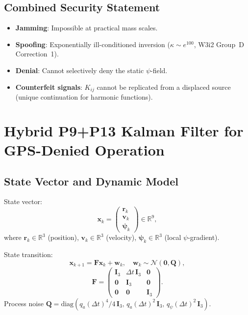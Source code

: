 \documentclass[aps,prd,twocolumn,superscriptaddress,nofootinbib]{revtex4-2}
\newcommand{\Kij}{K_{ij}}
\begin{document}
\subsection{Combined Security Statement}

\begin{itemize}
\item \textbf{Jamming}: Impossible at practical mass scales.
\item \textbf{Spoofing}: Exponentially ill-conditioned inversion
  ($\kappa \sim e^{100}$, W3i2 Group~D Correction~1).
\item \textbf{Denial}: Cannot selectively deny the static $\psi$-field.
\item \textbf{Counterfeit signals}: $\Kij$ cannot be replicated from
  a displaced source (unique continuation for harmonic functions).
\end{itemize}

\section{Hybrid P9+P13 Kalman Filter for GPS-Denied Operation}
\label{sec:kalman}

\subsection{State Vector and Dynamic Model}

State vector:
\begin{equation}
\mathbf{x}_k = \begin{pmatrix} \mathbf{r}_k \\ \mathbf{v}_k \\ \boldsymbol{\psi}_k \end{pmatrix}
\in \mathbb{R}^9,
\label{eq:state}
\end{equation}
where $\mathbf{r}_k \in \mathbb{R}^3$ (position), $\mathbf{v}_k \in \mathbb{R}^3$
(velocity), $\boldsymbol{\psi}_k \in \mathbb{R}^3$ (local $\psi$-gradient).

State transition:
\begin{equation}
\mathbf{x}_{k+1} = \mathbf{F}\mathbf{x}_k + \mathbf{w}_k,\quad
\mathbf{w}_k \sim \mathcal{N}(\mathbf{0},\mathbf{Q}),
\label{eq:state-transition}
\end{equation}
\begin{equation}
\mathbf{F} = \begin{pmatrix}
\mathbf{I}_3 & \Delta t\,\mathbf{I}_3 & \mathbf{0} \\
\mathbf{0} & \mathbf{I}_3 & \mathbf{0} \\
\mathbf{0} & \mathbf{0} & \mathbf{I}_3
\end{pmatrix}.
\label{eq:F}
\end{equation}
Process noise $\mathbf{Q} = \mathrm{diag}(q_a(\Delta t)^4/4\,\mathbf{I}_3,\,
q_a(\Delta t)^2\,\mathbf{I}_3,\, q_\psi(\Delta t)^2\,\mathbf{I}_3)$.
\end{document}
